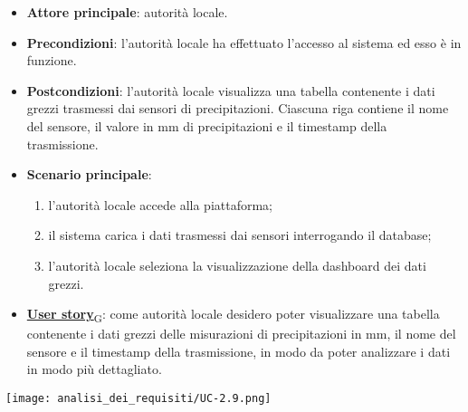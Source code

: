\begin{itemize}
	\item \textbf{Attore principale}: autorità locale.
	\item \textbf{Precondizioni}: l'autorità locale ha effettuato l'accesso al sistema ed esso è in funzione.
	\item \textbf{Postcondizioni}: l'autorità locale visualizza una tabella contenente i dati grezzi trasmessi dai sensori di precipitazioni.
	      Ciascuna riga contiene il nome del sensore, il valore in mm di precipitazioni e il timestamp della trasmissione.
	\item \textbf{Scenario principale}:
	      \begin{enumerate}
		      \item l'autorità locale accede alla piattaforma;
		      \item il sistema carica i dati trasmessi dai sensori interrogando il database;
		      \item l'autorità locale seleziona la visualizzazione della dashboard dei dati grezzi.
	      \end{enumerate}
	\item \href{https://7last.github.io/docs/pb/documentazione-interna/glossario\#user-story}{\textbf{User story}\textsubscript{G}}:
	      come autorità locale desidero poter visualizzare una tabella contenente i dati grezzi delle misurazioni di precipitazioni in mm,
	      il nome del sensore e il timestamp della trasmissione, in modo da poter analizzare i dati in modo più dettagliato.
\end{itemize}
\begin{center}
	\texttt{[image: analisi\_dei\_requisiti/UC-2.9.png]}
\end{center}


